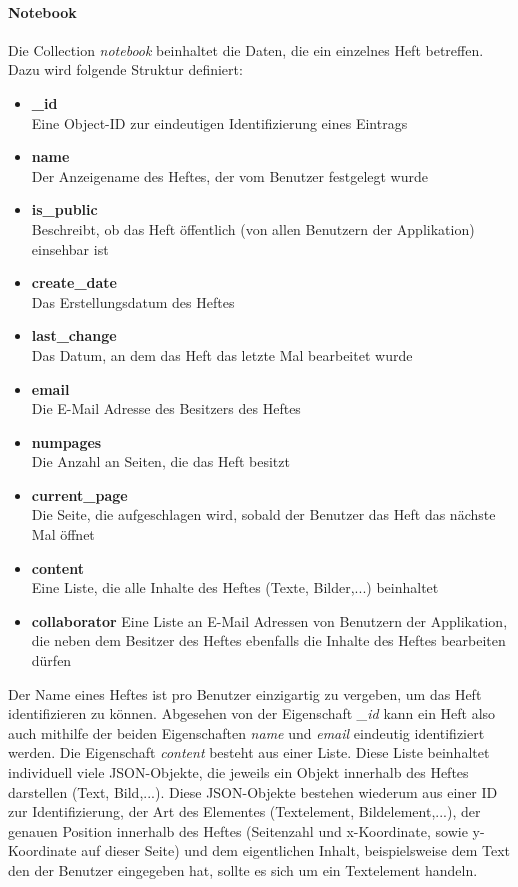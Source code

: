 \paragraph{Notebook}
\label{sec:datamgmt-notebook}
Die Collection \textit{notebook} beinhaltet die Daten, die ein einzelnes Heft betreffen. Dazu wird folgende Struktur definiert:
\begin{itemize}
\item \textbf{\_id}\\ Eine Object-ID zur eindeutigen Identifizierung eines Eintrags
\item \textbf{name}\\ Der Anzeigename des Heftes, der vom Benutzer festgelegt wurde
\item \textbf{is\_public}\\ Beschreibt, ob das Heft öffentlich (von allen Benutzern der Applikation) einsehbar ist
\item \textbf{create\_date}\\ Das Erstellungsdatum des Heftes
\item \textbf{last\_change}\\ Das Datum, an dem das Heft das letzte Mal bearbeitet wurde
\item \textbf{email}\\ Die E-Mail Adresse des Besitzers des Heftes
\item \textbf{numpages}\\ Die Anzahl an Seiten, die das Heft besitzt
\item \textbf{current\_page}\\ Die Seite, die aufgeschlagen wird, sobald der Benutzer das Heft das nächste Mal öffnet
\item \textbf{content}\\ Eine Liste, die alle Inhalte des Heftes (Texte, Bilder,...) beinhaltet
\item \textbf{collaborator} Eine Liste an E-Mail Adressen von Benutzern der Applikation, die neben dem Besitzer des Heftes ebenfalls die Inhalte des Heftes bearbeiten dürfen
\end{itemize}
Der Name eines Heftes ist pro Benutzer einzigartig zu vergeben, um das Heft identifizieren zu können. Abgesehen von der Eigenschaft \textit{\_id} kann ein Heft also auch mithilfe der beiden Eigenschaften \textit{name} und \textit{email} eindeutig identifiziert werden. Die Eigenschaft \textit{content} besteht aus einer Liste. Diese Liste beinhaltet individuell viele JSON-Objekte, die jeweils ein Objekt innerhalb des Heftes darstellen (Text, Bild,...). Diese JSON-Objekte bestehen wiederum aus einer ID zur Identifizierung, der Art des Elementes (Textelement, Bildelement,...), der genauen Position innerhalb des Heftes (Seitenzahl und x-Koordinate, sowie y-Koordinate auf dieser Seite) und dem eigentlichen Inhalt, beispielsweise dem Text den der Benutzer eingegeben hat, sollte es sich um ein Textelement handeln.

